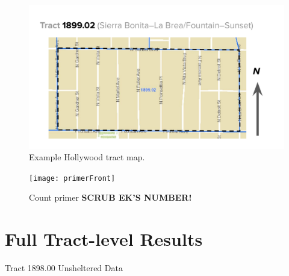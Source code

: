 \documentclass[11pt,twocolumn]{article}
\def\bfr{\bf\color{red}}
\begin{document}
\begin{figure}
	\centering
	\includegraphics[width =\linewidth]{tractMap}
	\caption{Example Hollywood tract map.}
\end{figure}

\begin{figure}
	\centering
	\texttt{[image: primerFront]}
	\caption{Count primer {\bfr SCRUB EK'S NUMBER!}}
\end{figure}

\section{Full Tract-level Results}


\begin{table}[]
\caption{Tract 1898.00 Unsheltered Data}
\caption*{Quantities in parentheses denote 95\% uncertainties (binomial in the case of the categories). Uncertainties larger than estimates imply that only upper limits can be stated confidently.}
\label{tbl:}
\end{table}
\end{document}
